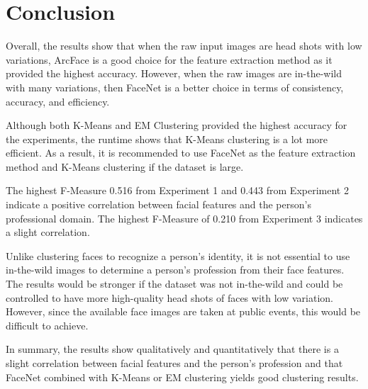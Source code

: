 \documentclass[12pt,english]{article}
\begin{document}
\section{Conclusion}
\quad
Overall, the results show that when the raw input images are head shots with low variations, ArcFace is a good choice for the feature extraction method as it provided the highest accuracy. However, when the raw images are in-the-wild with many variations, then FaceNet is a better choice in terms of consistency, accuracy, and efficiency. 

Although both K-Means and EM Clustering provided the highest accuracy for the experiments, the runtime shows that K-Means clustering is a lot more efficient. As a result, it is recommended to use FaceNet as the feature extraction method and K-Means clustering if the dataset is large.

The highest F-Measure 0.516 from Experiment 1 and 0.443 from Experiment 2 indicate a positive correlation between facial features and the person's professional domain. The highest F-Measure of 0.210 from Experiment 3 indicates a slight correlation.

Unlike clustering faces to recognize a person’s identity, it is not essential to use in-the-wild images to determine a person’s profession from their face features. The results would be stronger if the dataset was not in-the-wild and could be controlled to have more high-quality head shots of faces with low variation. However, since the available face images are taken at public events, this would be difficult to achieve.  

In summary, the results show qualitatively and quantitatively that there is a slight correlation between facial features and the person's profession and that FaceNet combined with K-Means or EM clustering yields good clustering results.
\end{document}
